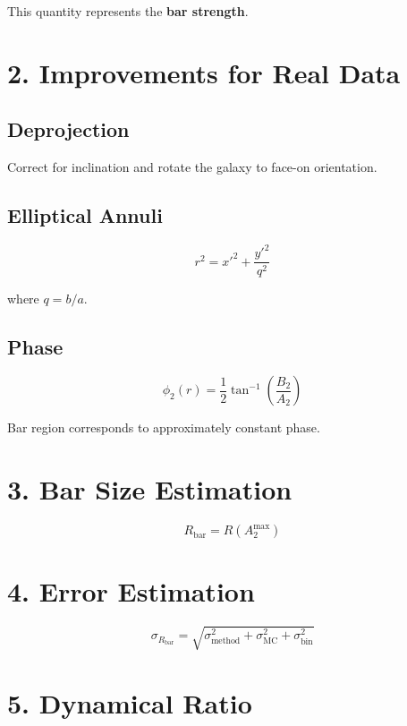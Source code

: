 \documentclass[11pt]{article}
\begin{document}
This quantity represents the \textbf{bar strength}.

\section*{2. Improvements for Real Data}

\subsection*{Deprojection}

Correct for inclination and rotate the galaxy to face-on orientation.

\subsection*{Elliptical Annuli}

\begin{equation}
r^2 = x'^2 + \frac{y'^2}{q^2}
\end{equation}

where $q = b/a$.

\subsection*{Phase}

\begin{equation}
\phi_2(r) = \frac{1}{2} \tan^{-1}\left(\frac{B_2}{A_2}\right)
\end{equation}

Bar region corresponds to approximately constant phase.

\section*{3. Bar Size Estimation}

\begin{equation}
R_{\text{bar}} = R(A_2^{\max})
\end{equation}

\section*{4. Error Estimation}

\begin{equation}
\sigma_{R_{\text{bar}}} = \sqrt{
\sigma_{\text{method}}^2 +
\sigma_{\text{MC}}^2 +
\sigma_{\text{bin}}^2
}
\end{equation}

\section*{5. Dynamical Ratio}
\end{document}
